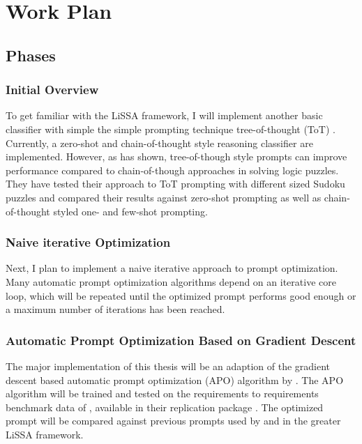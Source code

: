 \chapter{Work Plan}

\section{Phases}
\subsection{Initial Overview}
\label{phase_initial_overview}

To get familiar with the LiSSA framework, I will implement another basic classifier with simple the simple prompting technique tree-of-thought (ToT) \cite{long2023LargeLanguage}. 
Currently, a zero-shot and chain-of-thought style reasoning classifier are implemented. However, as \citeauthor{long2023LargeLanguage} has shown, tree-of-though style prompts can improve performance compared to chain-of-though approaches in solving logic puzzles. They have tested their approach to ToT prompting with different sized Sudoku puzzles and compared their results against zero-shot prompting as well as chain-of-thought styled one- and few-shot prompting. 


\subsection{Naive iterative Optimization}
\label{phase_naive_iterative}
Next, I plan to implement a naive iterative approach to prompt optimization. Many automatic prompt optimization algorithms \citeiterative  depend on an iterative core loop, which will be repeated until the optimized prompt performs good enough or a maximum number of iterations has been reached.

\subsection{Automatic Prompt Optimization Based on Gradient Descent}
\label{phase_gradient_descent}
The major implementation of this thesis will be an adaption of the gradient descent based automatic prompt optimization (APO) algorithm by . 
The APO algorithm will be trained and tested on the requirements to requirements benchmark data of \citeauthor{hey2025RequirementsTraceability}, available in their replication package \cite{hey2025ReplicationPackage}. The optimized prompt will be compared against previous prompts used by \citeauthor{fuchss2025LiSSAGeneric} and \citeauthor{hey2025RequirementsTraceability} in the greater LiSSA framework.


